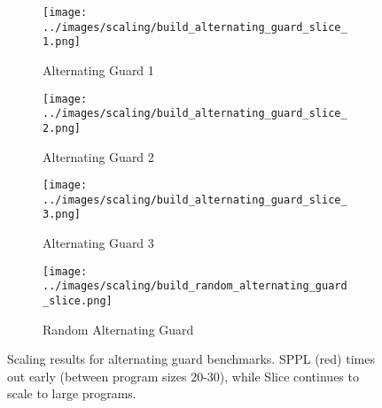 \begin{figure}[!t]
\centering
\begin{subfigure}{0.48\textwidth}
\texttt{[image: ../images/scaling/build\_alternating\_guard\_slice\_1.png]}
\caption{Alternating Guard 1}
\label{fig:alt-benchmarks-a}
\end{subfigure}
\hfill
\begin{subfigure}{0.48\textwidth}
\texttt{[image: ../images/scaling/build\_alternating\_guard\_slice\_2.png]}
\caption{Alternating Guard 2}
\label{fig:alt-benchmarks-b}
\end{subfigure}
\vspace{0.5em}
\begin{subfigure}{0.48\textwidth}
\texttt{[image: ../images/scaling/build\_alternating\_guard\_slice\_3.png]}
\caption{Alternating Guard 3}
\label{fig:alt-benchmarks-c}
\end{subfigure}
\hfill
\begin{subfigure}{0.48\textwidth}
\texttt{[image: ../images/scaling/build\_random\_alternating\_guard\_slice.png]}
\caption{Random Alternating Guard}
\label{fig:alt-benchmarks-d}
\end{subfigure}
\caption{Scaling results for alternating guard benchmarks. SPPL (red) times out early (between program sizes 20-30), while Slice continues to scale to large programs.}
\label{fig:alt-benchmarks}
\end{figure}